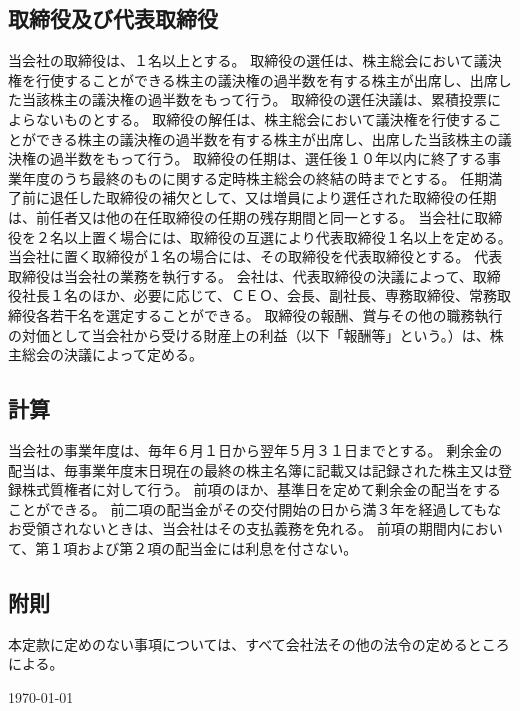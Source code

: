 \documentclass[10pt,a4paper,uplatex]{jsarticle}
\begin{document}
\subsection{取締役及び代表取締役}
当会社の取締役は、１名以上とする。
取締役の選任は、株主総会において議決権を行使することができる株主の議決権の過半数を有する株主が出席し、出席した当該株主の議決権の過半数をもって行う。
\term 取締役の選任決議は、累積投票によらないものとする。
取締役の解任は、株主総会において議決権を行使することができる株主の議決権の過半数を有する株主が出席し、出席した当該株主の議決権の過半数をもって行う。
取締役の任期は、選任後１０年以内に終了する事業年度のうち最終のものに関する定時株主総会の終結の時までとする。
\term 任期満了前に退任した取締役の補欠として、又は増員により選任された取締役の任期は、前任者又は他の在任取締役の任期の残存期間と同一とする。
当会社に取締役を２名以上置く場合には、取締役の互選により代表取締役１名以上を定める。
\term 当会社に置く取締役が１名の場合には、その取締役を代表取締役とする。
\term 代表取締役は当会社の業務を執行する。
\term 会社は、代表取締役の決議によって、取締役社長１名のほか、必要に応じて、ＣＥＯ、会長、副社長、専務取締役、常務取締役各若干名を選定することができる。
取締役の報酬、賞与その他の職務執行の対価として当会社から受ける財産上の利益（以下「報酬等」という。）は、株主総会の決議によって定める。

\subsection{計算}
当会社の事業年度は、毎年６月１日から翌年５月３１日までとする。
剰余金の配当は、毎事業年度末日現在の最終の株主名簿に記載又は記録された株主又は登録株式質権者に対して行う。
\term 前項のほか、基準日を定めて剰余金の配当をすることができる。
\term 前二項の配当金がその交付開始の日から満３年を経過してもなお受領されないときは、当会社はその支払義務を免れる。
\term 前項の期間内において、第１項および第２項の配当金には利息を付さない。

\subsection{附則}
本定款に定めのない事項については、すべて会社法その他の法令の定めるところによる。



\begin{flushleft}
\today\\
\vspace{10pt}
\MakeSignatureField
\end{flushleft}
\end{document}
